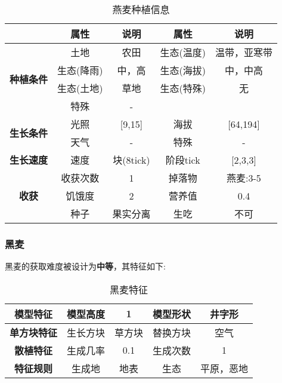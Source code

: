 \begin{table}[H]
    \centering
    \caption{燕麦种植信息}
    \label{table:燕麦种植信息}
    \setlength{\tabcolsep}{4mm}
    \begin{tabular}{c|cc|cc}
        \toprule
                                           & \textbf{属性} & \textbf{说明}   & \textbf{属性} & \textbf{说明} \\
        \midrule
        \multirow{4}{*}{\textbf{种植条件}} & 土地          & 农田            & 生态(温度)    & 温带，亚寒带    \\
                                           & 生态(降雨)    & 中，高          & 生态(海拔)    & 中，中高       \\
                                           & 生态(土地)    & 草地            & 生态(特殊)    & 无            \\
                                           & 特殊          & -                                \\
        \midrule
        \multirow{2}{*}{\textbf{生长条件}} & 光照          & [9,15]         & 海拔          & [64,194]      \\
                                           & 天气          & -              & 特殊          & -      \\
        \midrule
        \textbf{生长速度}                  & 速度          & 块(8tick)       & 阶段tick      & [2,3,3]       \\
        \midrule
        \multirow{3}{*}{\textbf{收获}}     & 收获次数      & 1               & 掉落物        & 燕麦:3-5      \\
                                           & 饥饿度        & 2               & 营养值        & 0.4           \\
                                           & 种子          & 果实分离        & 生吃          & 不可          \\
        \bottomrule
    \end{tabular}
\end{table}

\subsubsection{黑麦}

黑麦的获取难度被设计为\textbf{中等}，其特征如下:
\begin{table}[H]
    \centering
    \caption{黑麦特征}
    \label{table:黑麦特征}
    \setlength{\tabcolsep}{4mm}
    \begin{tabular}{c|cc|cc}
        \toprule
        \textbf{模型特征}                  & 模型高度 & 1      & 模型形状 & 井字形 \\
        \midrule
        \textbf{单方块特征}                & 生长方块 & 草方块 & 替换方块 & 空气   \\
        \midrule
        \textbf{散植特征}                  & 生成几率 & 0.1    & 生成次数 & 1      \\
        \midrule
        \multirow{1}{*}{\textbf{特征规则}} & 生成地   & 地表   & 生态     & 平原，恶地   \\
        \bottomrule
    \end{tabular}
\end{table}


